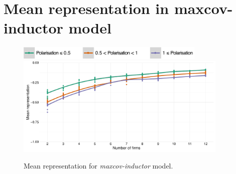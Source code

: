 \documentclass[preprint, 12pt]{elsarticle}
\begin{document}
\newpage
\section{Mean representation in maxcov-inductor model}
\label{app:representation_mi}

\begin{figure}[ht]
	\centering
	\includegraphics[width=90mm]{Graphics/legend_pol.pdf}
	\includegraphics[width=0.9\textwidth]{Graphics/fig613a.pdf}
	\caption{Mean representation for \emph{maxcov-inductor} model.}
	\label{fig:representation_mi}
\end{figure}



\newpage
%

\raggedright
\singlespacing
\small

\end{document}
